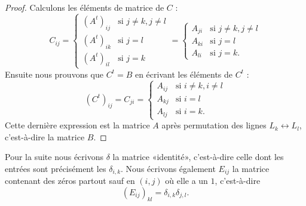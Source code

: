 \begin{proof}
	Calculons les éléments de matrice de \( C\) :
	\begin{equation}
		C_{ij}=\begin{cases}
			(A^t)_{ij} & \text{si }  j\neq k, j\neq l \\
			(A^t)_{ik} & \text{si } j=l               \\
			(A^t)_{il} & \text{si }j=k
		\end{cases}=
		\begin{cases}
			A_{ji} & \text{si }  j\neq k, j\neq l \\
			A_{ki} & \text{si } j=l               \\
			A_{li} & \text{si }j=k.
		\end{cases}
	\end{equation}
	Ensuite nous prouvons que \( C^t=B\) en écrivant les éléments de \( C^t\) :
	\begin{equation}
		(C^t)_{ij}=C_{ji}=\begin{cases}
			A_{ij} & \text{si } i\neq k, i\neq l \\
			A_{kj} & \text{si } i=l              \\
			A_{lj} & \text{si }i=k.
		\end{cases}
	\end{equation}
	Cette dernière expression est la matrice \( A\) après permutation des lignes \( L_k\leftrightarrow L_l\), c'est-à-dire la matrice \( B\).
\end{proof}

Pour la suite nous écrivons \( \delta\) la matrice «identité», c'est-à-dire celle dont les entrées sont précisément les \( \delta_{i,k}\).  Nous écrivons également \( E_{ij}\) la matrice contenant des zéros partout sauf en \( (i,j)\) où elle a un \( 1\), c'est-à-dire
\begin{equation}
	(E_{ij})_{kl}=\delta_{i,k}\delta_{j,l}.
\end{equation}

